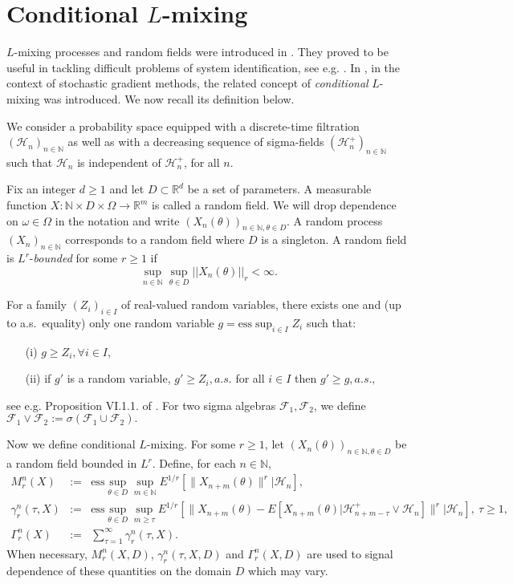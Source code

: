 \documentclass[a4paper]{article}
\begin{document}
\section{Conditional $L$-mixing}\label{lm}

$L$-mixing processes and random fields
were introduced in \cite{laci1}. They proved to be useful in
tackling difficult problems of system identification, see e.g. \cite{laci6,laci4,laci5,laci7,q}. In
\cite{4}, in the context of stochastic gradient methods, the related
concept of \emph{conditional} $L$-mixing
was introduced. We now recall its definition below.

We consider a probability space equipped
with a discrete-time filtration $(\mathcal{H}_n)_{n\in\mathbb{N}}$ as well as with a decreasing sequence of sigma-fields $(\mathcal{H}_n^+)_{n\in\mathbb{N}}$ such that $\mathcal{H}_n$ is
independent of $\mathcal{H}_n^+$, for all $n$.

Fix an integer $d\geq 1$ and let $D\subset \mathbb{R}^{d}$ be a set of parameters. A measurable function
$X:\mathbb{N}\times D\times\Omega\to\mathbb{R}^{{m}}$ is called a random field. We will drop dependence on $\omega\in\Omega$ in the notation and write 
$(X_n(\theta))_{n\in\mathbb{N}, \theta\in D}$. A random
process $(X_n)_{n\in\mathbb{N}}$ corresponds to a random field where $D$
is a singleton. A random field is $L^r$-\emph{bounded} for some $r\geq 1$
if
$$
\sup_{n\in\mathbb{N}}\sup_{\theta\in D} ||X_n(\theta)||_r<\infty.
$$


For a family $(Z_i)_{i\in I}$ of real-valued random variables, there exists one and (up to a.s.\ 
equality) only one random variable $g = \mathrm{ess}\sup_{i\in I} Z_i$ such that:
\begin{enumerate}
	\item[(i)] $g \ge Z_i, \forall i \in I$,
	\item[(ii)] if $g'$ is a random variable, $g' \ge Z_i, a.s.$ for all $i \in I$ then $g' \ge g, a.s.,$
\end{enumerate} 
see e.g. Proposition VI.1.1. of \cite{neveu}. %
For two sigma algebras $\mathcal{F}_1, \mathcal{F}_2$, we define $\mathcal{F}_1 \vee \mathcal{F}_2:= \sigma\left( \mathcal{F}_1 \cup \mathcal{F}_2\right).$

Now we define conditional $L$-mixing.
For some $r\geq 1$, let $(X_n(\theta))_{n\in\mathbb{N}, \theta\in D}$ be a random field bounded in $L^r$.
Define, for each $n\in\mathbb{N}$,
\begin{eqnarray*}
	M^{n}_r(X) &:=& \mathrm{ess}\sup_{\theta\in D}\sup_{m \in\mathbb{N}}
	E^{1/r}[\|X_{n+m}(\theta)\|^r\big\vert\mathcal{H}_n],\\
	\gamma^{n}_r(\tau,X)&:=& \mathrm{ess}\sup_{\theta\in D}\sup_{m\geq\tau}
	E^{1/r}[\|X_{n+m}(\theta)-E[X_{n+m}(\theta)\vert \mathcal{H}_{n+m-\tau}^+\vee \mathcal{H}_n]\|^r\big\vert
	\mathcal{H}_n],\ \tau\geq 1,\\
	\Gamma^{n}_r(X) &:=&\sum_{\tau= 1}^{\infty}\gamma^{n}_r(\tau,X).
\end{eqnarray*}
When necessary, $M^{n}_r(X,D)$,
$\gamma^{n}_r(\tau,X,D)$ and $\Gamma^{n}_r(X,D)$ are used to signal dependence of
these quantities on the domain $D$ which may vary.
\end{document}
